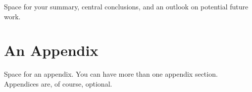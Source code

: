\documentclass[a4paper,oneside,10pt,ngerman,english]{scrartcl}
\begin{document}
Space for your summary, central conclusions, and an outlook on potential future work.



\printbibliography

\appendix


\section{An Appendix}
\label{app:an-appendix}

Space for an appendix.
You can have more than one appendix section.
Appendices are, of course, optional.


\cleardoubleoddpage
\end{document}
